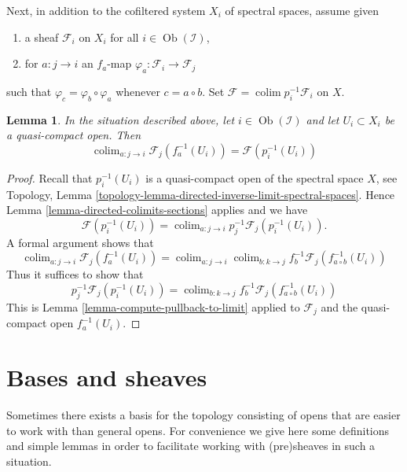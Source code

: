 \documentclass{stacks-project}
\theoremstyle{plain}
\newtheorem{lemma}[subsection]{Lemma}
\theoremstyle{definition}
\theoremstyle{remark}
\numberwithin{equation}{subsection}
\def\colim{\mathop{\mathrm{colim}}\nolimits}
\def\Ob{\mathop{\mathrm{Ob}}\nolimits}
\begin{document}
\noindent
Next, in addition to the cofiltered system $X_i$ of spectral spaces,
assume given
\begin{enumerate}
\item a sheaf $\mathcal{F}_i$ on $X_i$ for all $i \in \Ob(\mathcal{I})$,
\item for $a : j \to i$ an $f_a$-map
$\varphi_a : \mathcal{F}_i \to \mathcal{F}_j$
\end{enumerate}
such that $\varphi_c = \varphi_b \circ \varphi_a$
whenever $c = a \circ b$. Set $\mathcal{F} = \colim p_i^{-1}\mathcal{F}_i$
on $X$.

\begin{lemma}
\label{lemma-descend-opens}
In the situation described above, let $i \in \Ob(\mathcal{I})$ and let
$U_i \subset X_i$ be a quasi-compact open. Then
$$
\colim_{a : j \to i} \mathcal{F}_j(f_a^{-1}(U_i)) = \mathcal{F}(p_i^{-1}(U_i))
$$
\end{lemma}

\begin{proof}
Recall that $p_i^{-1}(U_i)$ is a quasi-compact open of the spectral space
$X$, see
Topology, Lemma \ref{topology-lemma-directed-inverse-limit-spectral-spaces}.
Hence Lemma \ref{lemma-directed-colimits-sections} applies and we have
$$
\mathcal{F}(p_i^{-1}(U_i)) =
\colim_{a : j \to i} p_j^{-1}\mathcal{F}_j(p_i^{-1}(U_i)).
$$
A formal argument shows that
$$
\colim_{a : j \to i} \mathcal{F}_j(f_a^{-1}(U_i)) =
\colim_{a : j \to i} \colim_{b : k \to j}
f_b^{-1}\mathcal{F}_j(f_{a \circ b}^{-1}(U_i))
$$
Thus it suffices to show that
$$
p_j^{-1}\mathcal{F}_j(p_i^{-1}(U_i)) =
\colim_{b : k \to j} f_b^{-1}\mathcal{F}_j(f_{a \circ b}^{-1}(U_i))
$$
This is Lemma \ref{lemma-compute-pullback-to-limit}
applied to $\mathcal{F}_j$ and the quasi-compact open $f_a^{-1}(U_i)$.
\end{proof}

















\section{Bases and sheaves}
\label{section-bases}

\noindent
Sometimes there exists a basis for the topology
consisting of opens that are easier to work with
than general opens. For convenience we give here
some definitions and simple lemmas in order to
facilitate working with (pre)sheaves in such a situation.
\end{document}
